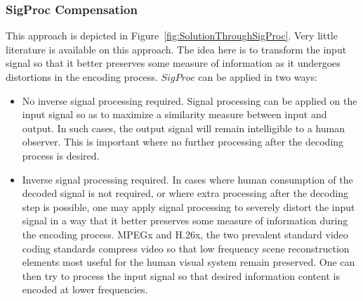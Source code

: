 \documentclass{article}
\begin{document}
\subsubsection{SigProc Compensation}
This approach is depicted in Figure~\ref{fig:SolutionThroughSigProc}.  Very little literature is available on this approach.  The idea here is to transform the input signal so that it better preserves some measure of information as it undergoes distortions in the encoding process.  $SigProc$ can be applied in two ways:

\begin{itemize}
\item {No inverse signal processing required.}  Signal processing can be applied on the input signal so as to maximize a similarity measure between input and output.  In such cases, the output signal will remain intelligible to a human observer.  This is important where no further processing after the decoding process is desired.

\item {Inverse signal processing required.}  In cases where human consumption of the decoded signal is not required, or where extra processing after the decoding step is possible, one may apply signal processing to severely distort the input signal in a way that it better preserves some measure of information during the encoding process.  MPEGx and H.26x, the two prevalent standard video coding standards compress video so that low frequency scene reconstruction elements most useful for the human visual system remain preserved.  One can then try to process the input signal so that desired information content is encoded at lower frequencies.

\begin{figure}%
			\centering


\end{figure}
\end{itemize}
\end{document}
